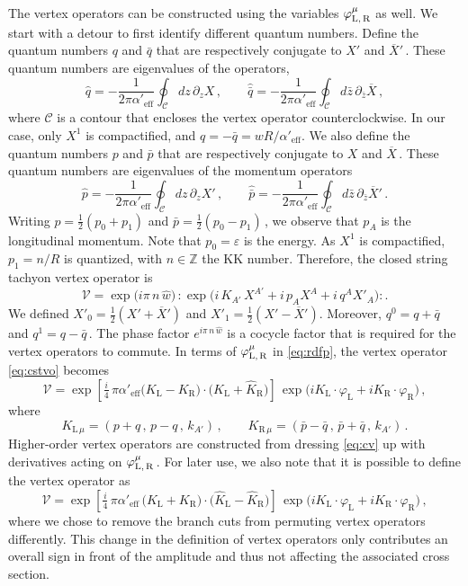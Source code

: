 \documentclass[11pt]{article}
\newcommand{\be}{\begin{equation}}
\newcommand{\ee}{\end{equation}}
\newcommand{\CC}{\mathcal{C}}
\newcommand{\CV}{\mathcal{V}}
\newcommand{\lr}{\left (}
\newcommand{\rr}{\right )}
\newcommand{\ls}{\left [}
\newcommand{\rs}{\right ]}
\newcommand{\p}{\partial}
\begin{document}
The vertex operators can be constructed using the variables $\varphi^\mu_\text{L,\,R}$ as well. 
%
We start with a detour to first identify different quantum numbers. Define the quantum numbers $q$ and $\bar{q}$ that are respectively conjugate to $X'$ and $\overline{X}{}'$\,. These quantum numbers are eigenvalues of the operators,
%
\be \label{eq:qqb}
    \hat{q} = - \frac{1}{2\pi \alpha'_\text{eff}} \oint_\CC dz \, \p_z X\,,
        \qquad%
    \hat{\bar{q}} = - \frac{1}{2\pi \alpha'_\text{eff}} \oint_\CC d\bar{z} \, \p_{\bar{z}} \overline{X}\,,
\ee
%
where $\CC$ is a contour that encloses the vertex operator counterclockwise. In our case, only $X^1$ is compactified, and $q = - \bar{q} = w R / \alpha'_\text{eff}$. We also define the quantum numbers $p$ and $\bar{p}$ that are respectively conjugate to $X$ and $\overline{X}$\,. These quantum numbers are eigenvalues of the momentum operators
%
\be
    \hat{p} = - \frac{1}{2\pi \alpha'_\text{eff}} \oint_\CC dz \, \p_z X'\,,
        \qquad%
    \hat{\bar{p}} = - \frac{1}{2\pi \alpha'_\text{eff}} \oint_\CC d\bar{z} \, \p_{\bar{z}} \overline{X}'\,.
\ee
%
Writing $p = \frac{1}{2} (p^{}_0 + p^{}_1)$ and $\bar{p} = \frac{1}{2} (p^{}_0 - p^{}_1)$\,, we observe that $p^{}_A$ is the longitudinal momentum. Note that $p^{}_0 = \varepsilon$ is the energy. As $X^1$ is compactified, $p_1 = n / R$ is quantized, with $n \in \mathbb{Z}$ the KK number. Therefore, the closed string tachyon vertex operator is
%
\be \label{eq:cstvo}
    \CV = \exp \bigl( i \pi \, n \, \hat{w} \bigr) \, : \! \exp \bigl( i \, K_{\!A'} \, X^{\!A'} + i \, p^{}_{\!A} X^{\!A} + i \, q^A X'_{\!A} \bigr) \! :.
\ee
%
We defined $X'_0 = \frac{1}{2} \lr X' + \overline{X}{}' \rr$ and $X'_1 = \frac{1}{2} \lr X' - \overline{X}{}' \rr$. Moreover, $q^0 = q + \bar{q}$ and $q^1 = q - \bar{q}$\,. The phase factor $e^{i \pi \, n \, \hat{w}}$ is a cocycle factor that is required for the vertex operators to commute. 
In terms of $\varphi_\text{L,\,R}^\mu$ in \eqref{eq:rdfp}, the vertex operator \eqref{eq:cstvo} becomes
%
\be \label{eq:cv}
    \CV = \exp \ls \tfrac{i}{4} \, \pi \alpha'_\text{eff} \bigl( K_\text{L} - K_\text{R} \bigr) \cdot \bigl( \hat{K}_\text{L} + \hat{K}_\text{R} \bigr) \rs \, \exp \bigl( i K^{}_{\text{L}} \cdot \varphi_\text{L} + i K^{}_{\text{R}} \cdot \varphi_\text{R} \bigr)\,,
\ee
%
where
%
\be \label{eq:qn}
    K^{}_{\text{L}\,\mu} = ( p + q\,, \, p - q\,, \, k_{A'} )\,,
        \qquad%
    K^{}_{ \text{R}\, \mu } = ( \bar{p} - \bar{q}\,, \, \bar{p} + \bar{q}\,, \, k_{A'} )\,.
\ee
%
Higher-order vertex operators are constructed from dressing \eqref{eq:cv} up with derivatives acting on $\varphi_{\text{L,\,R}}^\mu$\,. For later use, we also note that it is possible to define the vertex operator as
%
\be 
    \CV = \exp \ls \tfrac{i}{4} \, \pi \alpha'_\text{eff} \, \bigl( K_\text{L} + K_\text{R} \bigr) \cdot \bigl( \hat{K}_\text{L} - \hat{K}_\text{R} \bigr) \rs \, \exp \bigl( i K^{}_{\text{L}} \cdot \varphi_\text{L} + i K^{}_{\text{R}} \cdot \varphi_\text{R} \bigr)\,,
\ee
%
where we chose to remove the branch cuts from permuting vertex operators differently. This change in the definition of vertex operators only contributes an overall sign in front of the amplitude and thus not affecting the associated cross section. 
%
\end{document}
